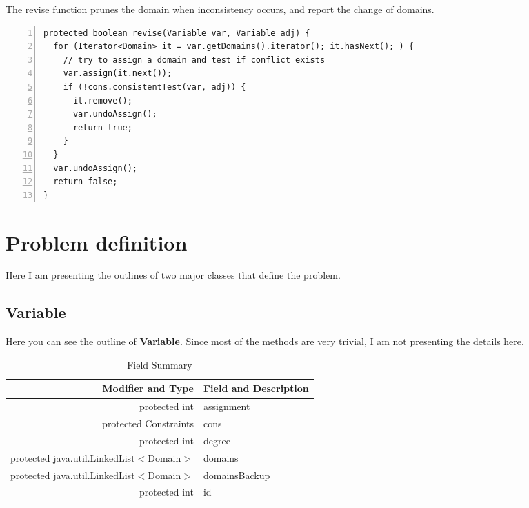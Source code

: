 \documentclass{article}
\begin{document}
The revise function prunes the domain when inconsistency occurs, and report the change of domains.

\begin{lstlisting}[numbers=left]   
protected boolean revise(Variable var, Variable adj) {
  for (Iterator<Domain> it = var.getDomains().iterator(); it.hasNext(); ) {
    // try to assign a domain and test if conflict exists
    var.assign(it.next());
    if (!cons.consistentTest(var, adj)) {
      it.remove();
      var.undoAssign();
      return true;
    }
  }
  var.undoAssign();
  return false;
}
\end{lstlisting}














\clearpage
\section{Problem definition}
Here I am presenting the outlines of two major classes that define the problem.

\subsection{Variable}

Here you can see the outline of \textbf{Variable}. Since most of the methods are very trivial, I am not presenting the details here.



\begin{table}[h]
\begin{center}
  \begin{tabular}{ |r | l | }
    \hline
    Modifier and Type & Field and Description \\ \hline
    protected int &	assignment                          \\ \hline
protected Constraints &	cons                            \\ \hline
protected int &	degree                                  \\ \hline
protected java.util.LinkedList$<$Domain$>$ &	domains       \\ \hline
protected java.util.LinkedList$<$Domain$>$ &	domainsBackup \\ \hline
protected int &	id \\ \hline

  \end{tabular}
\caption{Field Summary}
\end{center}
\end{table}
\end{document}
